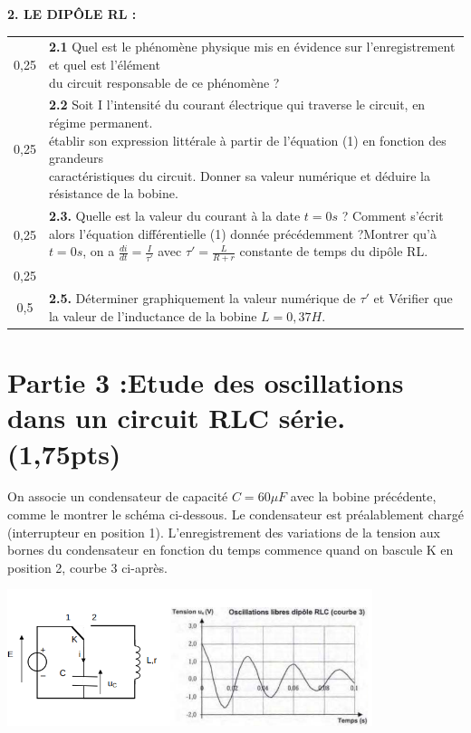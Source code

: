 \documentclass[12pt]{article}
\begin{document}
\textbf{2. LE DIPÔLE RL :}

\begin{tabular}{c|l}
	0,25  & \makecell[l]{\textbf{2.1 }Quel est le phénomène physique mis en évidence sur l’enregistrement et quel est l’élément\\ du circuit responsable de ce phénomène ?}\\
	0,25 & \makecell[l]{\textbf{2.2 }Soit I l’intensité du courant électrique qui traverse le circuit, en régime  permanent. \\établir son expression littérale à partir de l’équation (1) en fonction des  grandeurs\\ caractéristiques du circuit. Donner sa valeur numérique et déduire la
 résistance de la bobine. }\\
		0,25 & \makecell[l]{\textbf{2.3. } Quelle est la valeur du courant à la date $t = 0 s$ ? Comment s’écrit alors l’équation
		\\différentielle (1) donnée précédemment ?Montrer qu’à $t = 0 s$, on a $\frac{di}{dt} = \frac{I}{\tau'}$  avec $\tau'=  \frac{L}{R + r}$ \\constante de temps du
 dipôle RL. }\\
			0,25 & \makecell[l]{\textbf{2.4. }Vérifier que $\frac{L}{R+r}$ est homogène à un temps.}\\
			0,5 & \makecell[l]{\textbf{2.5. }Déterminer graphiquement la valeur numérique de $\tau'$ et Vérifier que la valeur\\de  l’inductance de la bobine $L=0,37H$.} 
		\end{tabular}

\section*{Partie 3 :Etude des oscillations dans un circuit RLC série. \dotfill(1,75pts)}
On associe un condensateur de capacité $C = 60 \mu F$ avec la bobine précédente, comme le
montrer le schéma ci-dessous.
Le condensateur est préalablement chargé (interrupteur en position 1). L’enregistrement
des variations de la tension aux bornes du condensateur en fonction du temps commence
quand on bascule K en position 2, courbe 3 ci-après. 

\begin{center}

	\includegraphics[width=0.8\textwidth]{./img/RLC.png}
\end{center}
\end{document}
